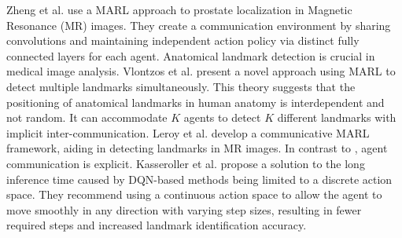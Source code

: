 \documentclass[acmsmall]{acmart}
\begin{document}
Zheng et al. \cite{zheng2021multi} use a MARL approach to prostate localization in Magnetic Resonance (MR) images. They create a communication environment by sharing convolutions and maintaining independent action policy via distinct fully connected layers for each agent.
Anatomical landmark detection is crucial in medical image analysis. Vlontzos et al.\cite{10.1007/978-3-030-32251-9_29} present a novel approach using MARL to detect multiple landmarks simultaneously. This theory suggests that the positioning of anatomical landmarks in human anatomy is interdependent and not random. It can accommodate $K$ agents to detect $K$ different landmarks with implicit inter-communication.
Leroy et al. \cite{10.1007/978-3-030-66843-3_18} develop a communicative MARL framework, aiding in detecting landmarks in MR images. In contrast to \cite{10.1007/978-3-030-32251-9_29}, agent communication is explicit.
Kasseroller et al. \cite{10.1007/978-3-030-78191-0_59} propose a solution to the long inference time caused by DQN-based methods being limited to a discrete action space. They recommend using a continuous action space to allow the agent to move smoothly in any direction with varying step sizes, resulting in fewer required steps and increased landmark identification accuracy.
\end{document}
